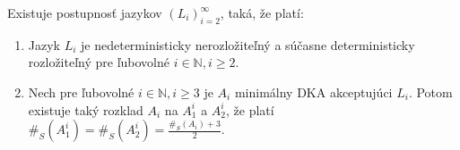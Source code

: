 \begin{theorem}
\label{thm:ndet_vs_det_diff_big}
Existuje postupnosť jazykov $ (L_i)_{i=2}^{\infty} $, taká, že platí:
\begin{enumerate}[label=(\alph*)]
\item \label{thm:ndet_vs_det_diff_big_item_1} Jazyk $ L_i $ je nedeterministicky nerozložiteľný a súčasne deterministicky rozložiteľný pre ľubovolné $ i \in \mathbb{N}, i \geq 2 $.
\item \label{thm:ndet_vs_det_diff_big_item_2} Nech pre ľubovolné $ i \in \mathbb{N}, i \geq 3 $ je $ A_i $ minimálny DKA akceptujúci $ L_i $. Potom existuje taký rozklad $ A_i $ na $ A_1^i $ a $ A_2^i $, že platí $ \#_S(A_1^i)=\#_S(A_2^i)=\frac{\#_S(A_i)+3}{2} $.
\end{enumerate}
\end{theorem}

